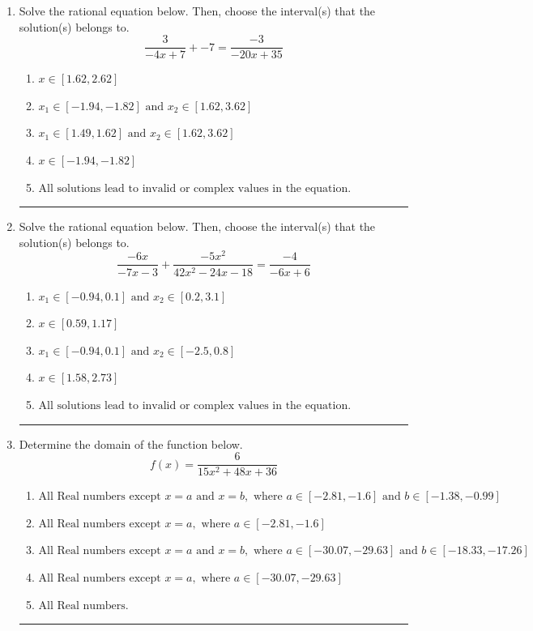 \documentclass[14pt]{extbook}
\newcommand{\litem}[1]{\item#1\hspace*{-1cm}\rule{\textwidth}{0.4pt}}
\begin{document}
\begin{enumerate}
{\begin{enumerate}[label=\Alph*.]
\end{enumerate} }
\litem{
Solve the rational equation below. Then, choose the interval(s) that the solution(s) belongs to.\[ \frac{3}{-4x + 7} + -7 = \frac{-3}{-20x + 35} \]\begin{enumerate}[label=\Alph*.]
\item \( x \in [1.62,2.62] \)
\item \( x_1 \in [-1.94, -1.82] \text{ and } x_2 \in [1.62,3.62] \)
\item \( x_1 \in [1.49, 1.62] \text{ and } x_2 \in [1.62,3.62] \)
\item \( x \in [-1.94,-1.82] \)
\item \( \text{All solutions lead to invalid or complex values in the equation.} \)

\end{enumerate} }
\litem{
Solve the rational equation below. Then, choose the interval(s) that the solution(s) belongs to.\[ \frac{-6x}{-7x -3} + \frac{-5x^{2}}{42x^{2} -24 x -18} = \frac{-4}{-6x + 6} \]\begin{enumerate}[label=\Alph*.]
\item \( x_1 \in [-0.94, 0.1] \text{ and } x_2 \in [0.2,3.1] \)
\item \( x \in [0.59,1.17] \)
\item \( x_1 \in [-0.94, 0.1] \text{ and } x_2 \in [-2.5,0.8] \)
\item \( x \in [1.58,2.73] \)
\item \( \text{All solutions lead to invalid or complex values in the equation.} \)

\end{enumerate} }
\litem{
Determine the domain of the function below.\[ f(x) = \frac{6}{15x^{2} +48 x + 36} \]\begin{enumerate}[label=\Alph*.]
\item \( \text{All Real numbers except } x = a \text{ and } x = b, \text{ where } a \in [-2.81, -1.6] \text{ and } b \in [-1.38, -0.99] \)
\item \( \text{All Real numbers except } x = a, \text{ where } a \in [-2.81, -1.6] \)
\item \( \text{All Real numbers except } x = a \text{ and } x = b, \text{ where } a \in [-30.07, -29.63] \text{ and } b \in [-18.33, -17.26] \)
\item \( \text{All Real numbers except } x = a, \text{ where } a \in [-30.07, -29.63] \)
\item \( \text{All Real numbers.} \)


\end{enumerate}}
\end{enumerate}
\end{document}
